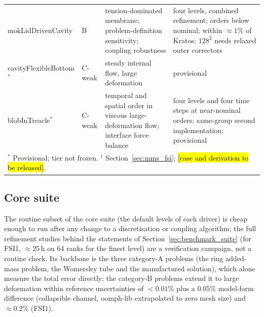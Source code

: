 \begin{table}[htbp]
\begin{tabular}{p{2.8cm}p{1.1cm}p{6.3cm}p{3.4cm}}
		mokLidDrivenCavity & B & tension-dominated membrane; problem-definition sensitivity; coupling robustness & four levels, combined refinement; orders below nominal; within $\approx1\%$ of Kratos; $128^2$ needs relaxed outer correctors \\
		cavityFlexibleBottom$^\ast$ & C-weak & steady internal flow, large deformation & provisional \\
		blobInTreacle$^\ast$ & C-weak & temporal and spatial order in viscous large-deformation flow; interface force balance & four levels and four time steps at near-nominal orders; same-group second implementation; provisional \\
		\bottomrule
		\multicolumn{4}{l}{$^\ast$ Provisional; tier not frozen. $^\dagger$ Section~\ref{sec:mms_fsi}; \hl{[case and derivation to be released]}.}
	\end{tabular}
\end{table}

\subsection{Core suite}\label{sec:core_suite}

The routine subset of the core suite (the default levels of each driver) is cheap enough to run after any change to a discretisation or coupling algorithm; the full refinement studies behind the statements of Section~\ref{sec:benchmark_suite} (for FSI1, $\approx25$\,h on 64 ranks for the finest level) are a verification campaign, not a routine check.
Its backbone is the three category-A problems (the ring added-mass problem, the Womersley tube and the manufactured solution), which alone measure the total error directly; the category-B problems extend it to large deformation within reference uncertainties of $<0.01\%$ plus a $0.05\%$ model-form difference (collapsible channel, oomph-lib extrapolated to zero mesh size) and $\approx0.2\%$ (FSI1).

